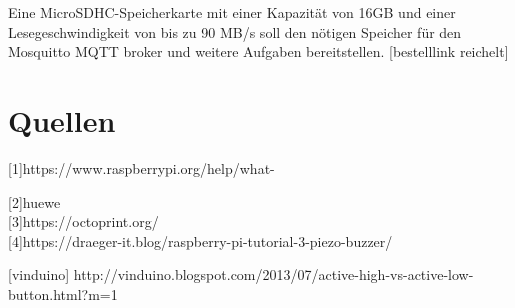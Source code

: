 \documentclass[12pt,a4paper,openany]{scrbook}
\begin{document}
Eine MicroSDHC-Speicherkarte mit einer Kapazität von 16GB und einer Lesegeschwindigkeit von bis zu 90 MB/s soll den nötigen Speicher für den Mosquitto MQTT broker und weitere Aufgaben bereitstellen. [bestelllink reichelt] 


\vspace{1cm}
\centering

\chapter{Quellen}
[1]https://www.raspberrypi.org/help/what-%

[2]huewe\\ 

[3]https://octoprint.org/\\ 

[4]https://draeger-it.blog/raspberry-pi-tutorial-3-piezo-buzzer/

[vinduino] http://vinduino.blogspot.com/2013/07/active-high-vs-active-low-button.html?m=1  
\end{document}
